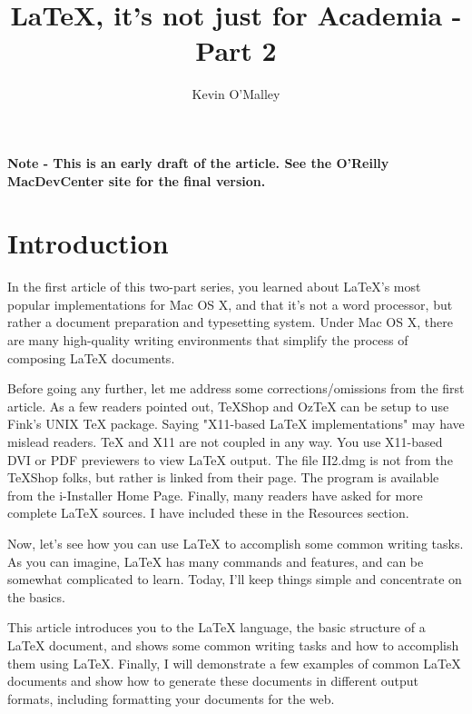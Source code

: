 \documentclass{article}
\begin{document}
\title{\vspace{-0.75in} LaTeX, it's not just for Academia - Part 2} 
\author{Kevin O'Malley}
\maketitle

\tableofcontents
\pagebreak
 
 \textbf{Note - This is an early draft of the article. See the O'Reilly MacDevCenter site for the final version.}
 
\section {Introduction}
In the first article of this two-part series, you learned about
LaTeX's most popular implementations for Mac OS X, and that it's not a
word processor, but rather a document preparation and typesetting
system. Under Mac OS X, there are many high-quality writing
environments that simplify the process of composing LaTeX documents.

Before going any further, let me address some corrections/omissions
from the first article. As a few readers pointed out, TeXShop and
OzTeX can be setup to use Fink's UNIX TeX package. Saying "X11-based
LaTeX implementations" may have mislead readers. TeX and X11 are not
coupled in any way. You use X11-based DVI or PDF previewers to view
LaTeX output. The file II2.dmg is not from the TeXShop folks, but
rather is linked from their page. The program is available from the
i-Installer Home Page. Finally, many readers have asked for more
complete LaTeX sources. I have included these in the Resources
section.

Now, let's see how you can use LaTeX to accomplish some common writing
tasks. As you can imagine, LaTeX has many commands and features, and
can be somewhat complicated to learn. Today, I'll keep things simple
and concentrate on the basics.


This article introduces you to the LaTeX language, the basic structure
of a LaTeX document, and shows some common writing tasks and how to
accomplish them using LaTeX. Finally, I will demonstrate a few
examples of common LaTeX documents and show how to generate these
documents in different output formats, including formatting your
documents for the web.
\end{document}
